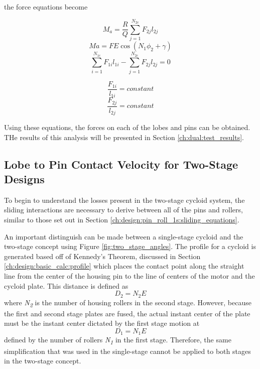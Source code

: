 the force equations become 

\begin{equation} \label{eq:dual_power}
M_a = \frac{R}{Q} \sum_{j=1}^{N_{2c}} F_{2j} l_{2j}
\end{equation}
\begin{equation} \label{eq:dual_input}
Ma = F E \cos(N_1 \phi_2 + \gamma)
\end{equation}
\begin{equation} \label{eq:dual_torqe}
\sum_{i=1}^{N_{1c}}F_{1i} l_{1i} - \sum_{j=1}^{N_{2c}}F_{2j} l_{2j} = 0
\end{equation}

\begin{equation} 
\frac{F_{1i}}{l_{1i}} = constant 
\end{equation}
\begin{equation}
\frac{F_{2j}}{l_{2j}} = constant
\end{equation}

Using these equations, the forces on each of the lobes and pins can be obtained. THe results of this analysis will be presented in Section \ref{ch:dual:test_results}.

\subsection{Lobe to Pin Contact Velocity for Two-Stage Designs}\label{ch:dual:equations:vel}
To begin to understand the losses present in the two-stage cycloid system, the sliding interactions are necessary to derive between all of the pins and rollers, similar to those set out in Section \ref{ch:design:pin_roll_1s:sliding_equations}.

An important distinguish can be made between a single-stage cycloid and the two-stage concept using Figure \ref{fig:two_stage_angles}. The profile for a cycloid is generated based off of Kennedy's Theorem, discussed in Section \ref{ch:design:basic_calc:profile} which places the contact point along the straight line from the center of the housing pin to the line of centers of the motor and the cycloid plate. This distance is defined as 
\begin{equation}
D_2 = N_2 E
\end{equation} 
where \textit{N\textsubscript{2}} is the number of housing rollers in the second stage. However, because the first and second stage plates are fused, the actual instant center of the plate must be the instant center dictated by the first stage motion at 
\begin{equation}
D_1 = N_1 E 
\end{equation} 
defined by the number of rollers \textit{N\textsubscript{1}} in the first stage. Therefore, the same simplification that was used in the single-stage cannot be applied to both stages in the two-stage concept. 

